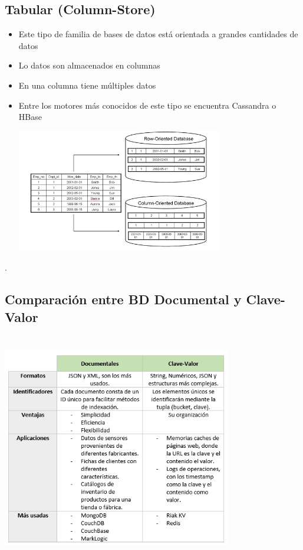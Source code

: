 \documentclass[%
 reprint,
 amsmath,amssymb,
 aps,
]{revtex4-1}
\begin{document}
\subsection{Tabular (Column-Store)}
\begin{itemize}
		\item Este tipo de familia de bases de datos está orientada a grandes cantidades de datos
		\item Lo datos son almacenados en columnas
		\item En una columna tiene múltiples datos
                     \item Entre los motores más conocidos de este tipo se encuentra Cassandra o HBase 
                     \begin{center}
		\includegraphics[width=9cm]{./Imagenes/5}
		\end{center}	
	          \end{itemize} 
.
\subsection{Comparación entre BD Documental y Clave-Valor}
		\begin{center}
		\includegraphics[width=10cm,height=10cm]{./Imagenes/cuadro}
		\end{center}	
\end{document}
